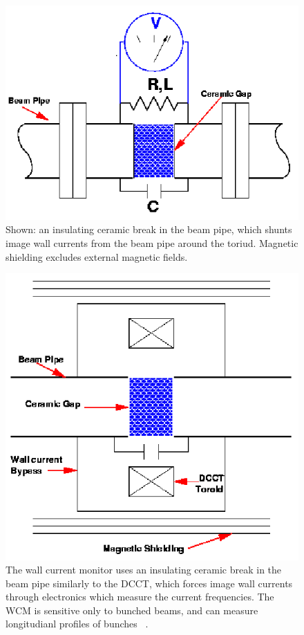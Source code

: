 \begin{figure}[ht]
  \begin{center}
    \includegraphics[width=0.75\linewidth]{./figures/wcm_schematic_cartoon}
    \caption{ 
      Shown: an insulating ceramic break in the beam pipe, which shunts
      image wall currents from the beam pipe around the toriud. Magnetic
      shielding excludes external magnetic fields.~\cite{kawallfocus2005} 
    }
    \label{fig:wcm_schematic_cartoon}
  \end{center}
\end{figure}

\begin{figure}[ht]
  \begin{center}
    \includegraphics[width=0.75\linewidth]{./figures/dcct_schematic_cartoon}
    \caption{
      The wall current monitor uses an insulating ceramic break in the beam pipe
      similarly to the DCCT, which forces image wall currents through
      electronics which measure the current frequencies. The WCM is sensitive
      only to bunched beams, and can measure longitudianl profiles of bunches
      ~\cite{kawallfocus2005}.
    }
    \label{fig:dcct_schematic_cartoon}
  \end{center}
\end{figure}


